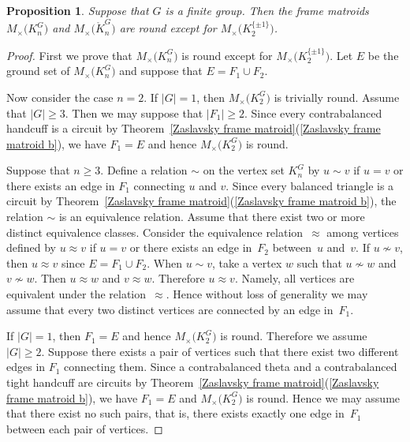 \documentclass[pdftex]{sigma}
\numberwithin{equation}{section}
\newtheorem{Proposition}[Theorem]{Proposition}
 { \theoremstyle{definition}
\newtheorem{Definition}[Theorem]{Definition}
\newtheorem{Example}[Theorem]{Example}
\newtheorem{Remark}[Theorem]{Remark}
\newtheorem{Question}[Theorem]{Question} }
\begin{document}
\begin{Proposition}\label{frame round}
Suppose that $ G $ is a finite group.
Then the frame matroids $ M_{\times}\big(K_{n}^{G}\big) $ and $ M_{\times}\big(\mathring{K}_{n}^{G}\big) $ are round except for $ M_{\times}\big(K_{2}^{\{\pm 1\}}\big) $.
\end{Proposition}
\begin{proof}
First we prove that $ M_{\times}\big(K_{n}^{G}\big) $ is round except for $ M_{\times}\big(K_{2}^{\{\pm 1\}}\big) $.
Let $ E $ be the ground set of $ M_{\times}\big(K_{n}^{G}\big) $ and suppose that $ E = F_{1} \cup F_{2} $.

Now consider the case $ n = 2 $.
If $ |G| = 1 $, then $ M_{\times}\big(K_{2}^{G}\big) $ is trivially round.
Assume that $ |G|\geq 3 $.
Then we may suppose that $ |F_{1}| \geq 2 $.
Since every contrabalanced handcuff is a circuit by Theorem~\ref{Zaslavsky frame matroid}(\ref{Zaslavsky frame matroid b}), we have $ F_{1} = E $ and hence $ M_{\times}\big(K_{2}^{G}\big) $ is round.

Suppose that $ n \geq 3 $.
Define a relation $ \sim $ on the vertex set $ K_{n}^{G} $ by $ u \sim v $ if $ u=v $ or there exists an edge in $ F_{1} $ connecting $ u $ and $ v $.
Since every balanced triangle is a circuit by Theorem~\ref{Zaslavsky frame matroid}(\ref{Zaslavsky frame matroid b}), the relation $ \sim $ is an equivalence relation.
Assume that there exist two or more distinct equivalence classes.
Consider the equivalence relation~$ \approx $ among vertices defined by $ u \approx v $ if $ u=v $ or there exists an edge in~$ F_{2} $ between~$ u $ and~$ v $.
If $ u \not\sim v $, then $ u \approx v $ since $ E=F_{1} \cup F_{2} $.
When $ u \sim v $, take a vertex $ w $ such that $ u \not\sim w $ and $ v \not\sim w $.
Then $ u \approx w $ and $ v \approx w $.
Therefore $ u \approx v $.
Namely, all vertices are equivalent under the relation~$ \approx $.
Hence without loss of generality we may assume that every two distinct vertices are connected by an edge in~$ F_{1} $.

If $ |G| = 1 $, then $ F_{1} = E $ and hence $ M_{\times}\big(K_{2}^{G}\big) $ is round.
Therefore we assume $ |G| \geq 2 $.
Suppose there exists a pair of vertices such that there exist two different edges in $ F_{1} $ connecting them.
Since a contrabalanced theta and a contrabalanced tight handcuff are circuits by Theorem~\ref{Zaslavsky frame matroid}(\ref{Zaslavsky frame matroid b}), we have $ F_{1} = E $ and $ M_{\times}\big(K_{2}^{G}\big) $ is round.
Hence we may assume that there exist no such pairs, that is, there exists exactly one edge in~$ F_{1} $ between each pair of vertices.


\end{proof}
\end{document}
